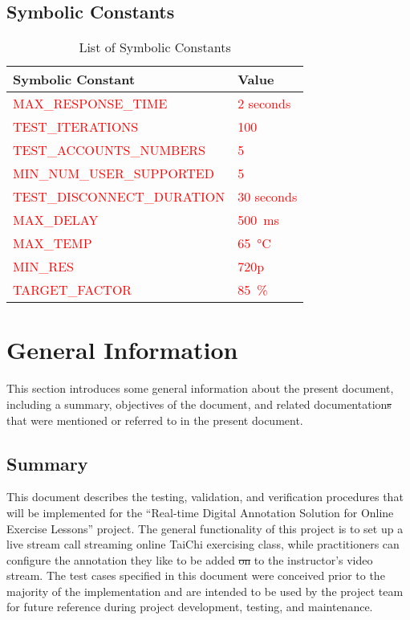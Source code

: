 \documentclass[12pt, titlepage]{article}
\newcommand{\rt}[1]{\textcolor{red}{#1}}
\begin{document}
\subsection{Symbolic Constants}\label{sec:symbolic-constants}
\begin{table}[H]
  \centering
  \begin{tabularx}{\linewidth}{lX} 
    \toprule
    \textbf{Symbolic Constant} & \textbf{Value} \\
    \midrule
    \rt{MAX\_RESPONSE\_TIME} & \rt{2 seconds}\\
    \rt{TEST\_ITERATIONS} & \rt{100}\\
    \rt{TEST\_ACCOUNTS\_NUMBERS} & \rt{5}\\
    \rt{MIN\_NUM\_USER\_SUPPORTED} & \rt{5}\\
    \rt{TEST\_DISCONNECT\_DURATION} & \rt{30 seconds}\\

    \rt{MAX\_DELAY}  & \rt{\SI{500}{\milli\second}} \\
    \rt{MAX\_TEMP}  & \rt{\SI{65}{\degreeCelsius}} \\
    \rt{MIN\_RES}  & \rt{720p} \\
    \rt{TARGET\_FACTOR}  & \rt{\SI{85}{\percent}} \\

    \bottomrule
  \end{tabularx}
  \caption{List of Symbolic Constants}
  \label{tab:symbolic-constants}
\end{table}

\newpage
{}

\section{General Information}

This section introduces some general information about the present document,
including a summary, objectives of the document, and related documentation\sout{s} that
were mentioned or referred to in the present document.

\subsection{Summary}

This document describes the testing, validation, and verification procedures
that will be implemented for the “Real-time Digital Annotation Solution for
Online Exercise Lessons” project. The general functionality of this project is
to set up a live stream call streaming online TaiChi exercising class, while
practitioners can configure the annotation they like to be added \sout{on} to the
instructor’s video stream. The test cases specified in this document were
conceived prior to the majority of the implementation and are intended to be
used by the project team for future reference during project development,
testing, and maintenance.
\end{document}
